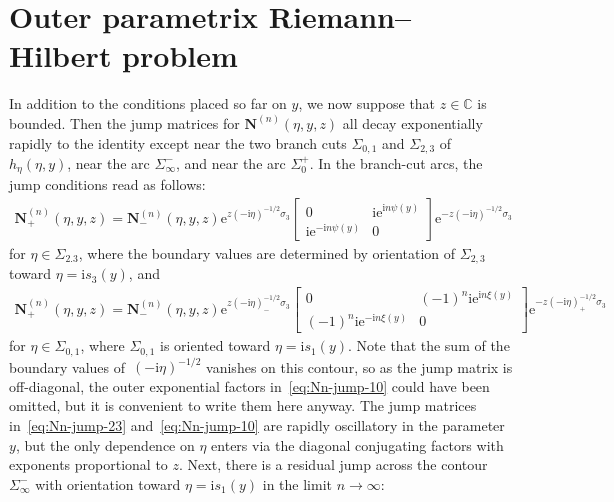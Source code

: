 \documentclass[pdftex]{sigma}
\numberwithin{equation}{section}
\begin{document}
\section{Outer parametrix Riemann--Hilbert problem}

In addition to the conditions placed so far on $y$, we now suppose that $z\in\mathbb{C}$ is bounded. Then the jump matrices for $\mathbf{N}^{(n)}(\eta,y,z)$ all decay exponentially rapidly to the identity except near the two branch cuts $\Sigma_{0,1}$ and $\Sigma_{2,3}$ of $h_\eta(\eta,y)$, near the arc $\Sigma_{\infty}^-$, and near the arc $\Sigma_0^+$. In the branch-cut arcs, the jump conditions read as follows:
\begin{gather}
\mathbf{N}^{(n)}_+(\eta,y,z)=\mathbf{N}^{(n)}_-(\eta,y,z)\mathrm{e}^{z(-\mathrm{i}\eta)^{-1/2}\sigma_3}\!\!\begin{bmatrix}0 & \mathrm{i}\mathrm{e}^{\mathrm{i} n\psi(y)}\\\mathrm{i}\mathrm{e}^{-\mathrm{i} n\psi(y)} & 0\end{bmatrix}\!\mathrm{e}^{-z(-\mathrm{i}\eta)^{-1/2}\sigma_3}
\!\label{eq:Nn-jump-23}
\end{gather}
for $\eta\in\Sigma_{2.3}$, where the boundary values are determined by orientation of $\Sigma_{2,3}$ toward $\eta=\mathrm{i} s_3(y)$, and
\begin{gather}
 \mathbf{N}^{(n)}_+(\eta,y,z)=\mathbf{N}^{(n)}_-(\eta,y,z)\mathrm{e}^{z(-\mathrm{i}\eta)^{-1/2}_-\sigma_3}\begin{bmatrix}0 & (-1)^n\mathrm{i}\mathrm{e}^{\mathrm{i} n\xi(y)}\\
(-1)^n\mathrm{i}\mathrm{e}^{-\mathrm{i} n\xi(y)} & 0\end{bmatrix}\mathrm{e}^{-z(-\mathrm{i}\eta)^{-1/2}_+\sigma_3} \!\!\!
\label{eq:Nn-jump-10}
\end{gather}
for $\eta\in\Sigma_{0,1}$, where $\Sigma_{0,1}$ is oriented toward $\eta=\mathrm{i} s_1(y)$.
Note that the sum of the boundary values of~$(-\mathrm{i}\eta)^{-1/2}$ vanishes on this contour, so as the jump matrix is off-diagonal, the outer exponential factors in~\eqref{eq:Nn-jump-10} could have been omitted, but it is convenient to write them here anyway. The jump matrices in~\eqref{eq:Nn-jump-23} and~\eqref{eq:Nn-jump-10} are rapidly oscillatory in the parameter $y$, but the only dependence on $\eta$ enters via the diagonal conjugating factors with exponents proportional to $z$. Next, there is a residual jump across the contour $\Sigma_\infty^-$ with orientation toward $\eta=\mathrm{i} s_1(y)$ in the limit $n\to\infty$:
\end{document}
